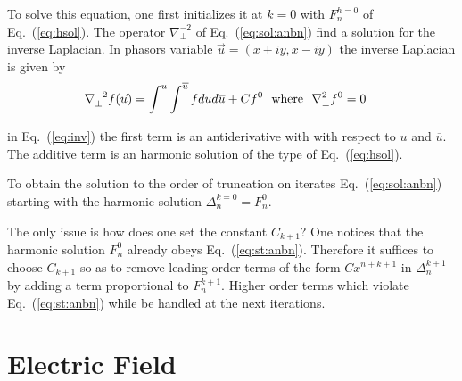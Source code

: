 \documentclass[11pt]{article} %
\def\eq#1{Eq.~(\ref{#1})}
\begin{document}
%
%
To solve this equation, one first initializes it at $k=0$ with 
%
${F}_{n}^{h=
0}$
of \eq{eq:hsol}. The operator %
${\nabla }_{\perp }^{-2}$ of \eq{eq:sol:anbn} find a solution for the inverse Laplacian. In phasors variable 
%
$\vec{u}=
\left({x+iy,x-iy}\right)$
the inverse Laplacian is   given by 
%
\begin{eqnarray}{\nabla }_{\perp }^{-2}f(\vec{u})&=\int_{}^{u}\int_{}^{\overline{u}}f du d\overline{u} + C {f}^{0}~~{\rm w}{\rm h}{\rm e}{\rm r}{\rm e}~~{\nabla }_{\perp }^{2}{f}^{0}=0\label{eq:inv}\end{eqnarray}
%

in \eq{eq:inv} the first term is an antiderivative with with respect to $u$ and $ \overline{u}$. The additive term is an harmonic solution of the type of \eq{eq:hsol}. 

To obtain the solution to the order of truncation on iterates \eq{eq:sol:anbn} starting with the harmonic solution %
${\Delta }_{n}^{k=
0}=
{F}_{n}^{0}$.

The only issue is how does one set the constant ${C}_{k+1}$? One notices that the harmonic solution  ${F}_{n}^{0}$ already obeys \eq{eq:st:anbn}. Therefore it suffices to  choose ${C}_{k+1}$ so as to remove leading order terms of the form $C x^{n+k+1}$  in ${\Delta }_{n}^{k+1}$ by adding a term proportional to ${F}_{n}^{k+1}$. Higher order terms which violate \eq{eq:st:anbn} while be handled at the next iterations.


\section{Electric Field}
\end{document}
